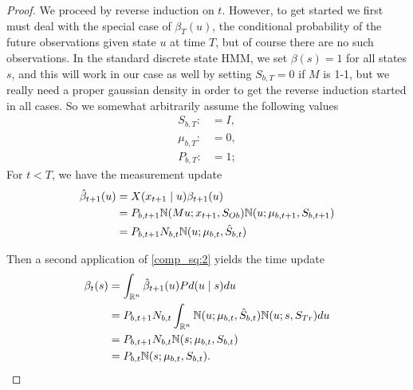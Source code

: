 \documentclass[12pt,leqno]{article}
\begin{document}
\begin{proof}
We proceed by reverse induction on $t$. However, to get started we first must  deal with
the special case of $\beta_{T}(u)$, the conditional probability of the future observations given
state $u$ at time $T$, but of course there are no such observations.  In the standard discrete
state HMM, we set $\beta(s) = 1$ for all states $s$, and this will work in our case as well by
setting $S_{b,T} = 0$ if $M$ is 1-1, but we really need a proper gaussian 
density in order to get the reverse induction started in all cases.  So we somewhat arbitrarily
assume the following values
\begin{align*}
  S_{b,T} :&= I,\\
  \mu_{b,T} :&= 0,\\
  P_{b,T} :&= 1;
\end{align*}
  For $t <  T$, we have the measurement update 
  \begin{align*}
    \hat{\beta}_{t+1}(u) &= X(x_{t+1}\mid u)\beta_{t+1}(u)\\
    &= P_{b,t+1}{\mathbb N}(Mu;x_{t+1},S_{Ob}){\mathbb N}(u;\mu_{b,t+1},S_{b,t+1})\\
    &= P_{b,t+1}N_{b,t}{\mathbb N}(u;\mu_{b,t},\hat{S}_{b,t})
  \end{align*}

  Then a second application of \eqref{comp_sq:2} yields the time update
  \begin{align*}
    \beta_t(s) &= \int_{{\mathbb R}^n}\hat{\beta}_{t+1}(u)Pd(u\mid s)du \\
    &= P_{b,t+1}N_{b,t}\int_{{\mathbb R}^n}{\mathbb N}(u;\mu_{b,t},\hat{S}_{b,t}){\mathbb N}(u;s,S_{Tr})du\\
    &=P_{b,t+1}N_{b,t}{\mathbb N}(s;\mu_{b,t},S_{b,t})\\
    &=P_{b,t}{\mathbb N}(s;\mu_{b,t},S_{b,t}).
  \end{align*}
\end{proof}
\end{document}
